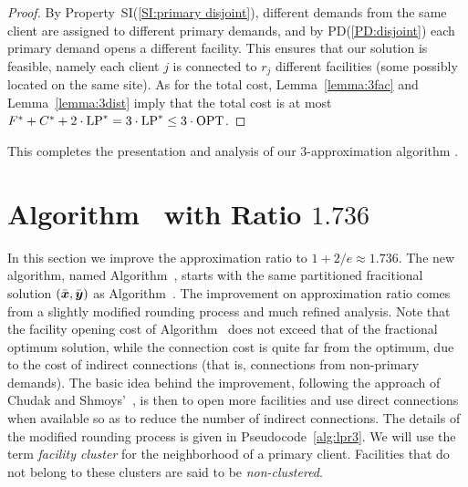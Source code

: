 \documentclass[11pt]{article}
\begin{document}
\begin{proof}
  By Property~SI(\ref{SI:primary disjoint}), different
  demands from the same client are assigned to different
  primary demands, and by PD(\ref{PD:disjoint}) each primary
  demand opens a different facility. This ensures that our
  solution is feasible, namely each client $j$ is connected
  to $r_j$ different facilities (some possibly located on
  the same site).  As for the total cost,
  Lemma~\ref{lemma:3fac} and Lemma~\ref{lemma:3dist} imply
  that the total cost is at most
  $F^\ast+C^\ast+2\cdot\mbox{\rm LP}^\ast = 3\cdot\mbox{\rm LP}^\ast \leq
  3\cdot\mbox{\rm OPT}$.
\end{proof}



This completes the presentation and analysis of our
$3$-approximation algorithm \EGUP.


\section{Algorithm~{\ECHU} with Ratio $1.736$}\label{sec: 1.736-approximation}

In this section we improve the approximation ratio to $1+2/e
\approx 1.736$. The new algorithm, named Algorithm~{\ECHU},
starts with the same partitioned fracitional solution
$(\bar{\boldsymbol{x}}, \bar{\boldsymbol{y}})$ as Algorithm~{\EGUP}. The improvement
on approximation ratio comes from a slightly modified
rounding process and much refined analysis.  Note that the
facility opening cost of Algorithm~{\EGUP} does not exceed
that of the fractional optimum solution, while the
connection cost is quite far from the optimum, due to the
cost of indirect connections (that is, connections from
non-primary demands).  The basic idea behind the
improvement, following the approach of Chudak and
Shmoys'~\cite{ChudakS04}, is then to open more facilities
and use direct connections when available so as to reduce
the number of indirect connections. The details of the
modified rounding process is given in
Pseudocode~\ref{alg:lpr3}.  We will use the term
\emph{facility cluster} for the neighborhood of a primary
client. Facilities that do not belong to these clusters are
said to be \emph{non-clustered}.
\end{document}

